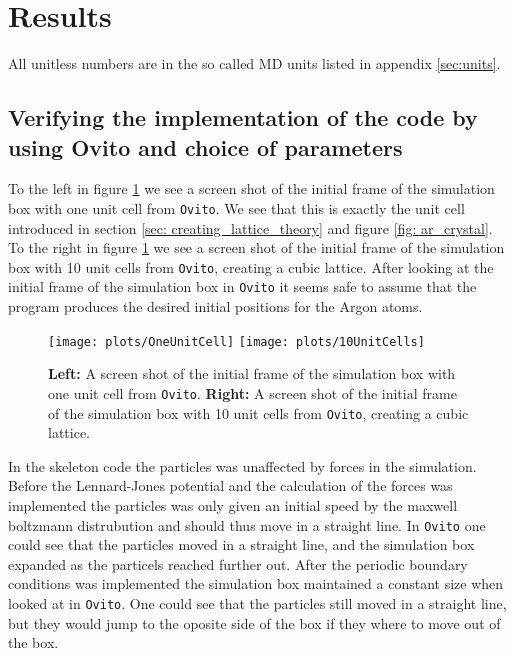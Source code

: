 \documentclass[11pt,a4wide]{article}
\begin{document}
\section{Results} 
All unitless numbers are in the so called MD units listed in appendix \ref{sec:units}.

\subsection{Verifying the implementation of the code by using Ovito and choice of parameters}

To the left in figure \ref{fig: unitCellsOvito} we see a screen shot of the initial frame of the simulation box with one unit cell from \texttt{Ovito}. We see that this is exactly the unit cell introduced in section \ref{sec: creating_lattice_theory} and figure \ref{fig: ar_crystal}. To the right in figure \ref{fig: unitCellsOvito} we see a screen shot of the initial frame of the simulation box with 10 unit cells from \texttt{Ovito}, creating a cubic lattice. After looking at the initial frame of the simulation box in \texttt{Ovito} it seems safe to assume that the program produces the desired initial positions for the Argon atoms. 

\begin{figure}[htp]
\centering
\texttt{[image: plots/OneUnitCell]}
\texttt{[image: plots/10UnitCells]}
\caption{\textbf{Left:} A screen shot of the initial frame of the simulation box with one unit cell from \texttt{Ovito}. \textbf{Right:} A screen shot of the initial frame of the simulation box with 10 unit cells from \texttt{Ovito}, creating a cubic lattice.}
\label{fig: unitCellsOvito}
\end{figure}

In the skeleton code the particles was unaffected by forces in the simulation. Before the Lennard-Jones potential and the calculation of the forces was implemented the particles was only given an initial speed by the maxwell boltzmann distrubution and should thus move in a straight line. In \texttt{Ovito} one could see that the particles moved in a straight line, and the simulation box expanded as the particels reached further out. After the periodic boundary conditions was implemented the simulation box maintained a constant size when looked at in \texttt{Ovito}. One could see that the particles still moved in a straight line, but they would jump to the oposite side of the box if they where to move out of the box. 
\end{document}
